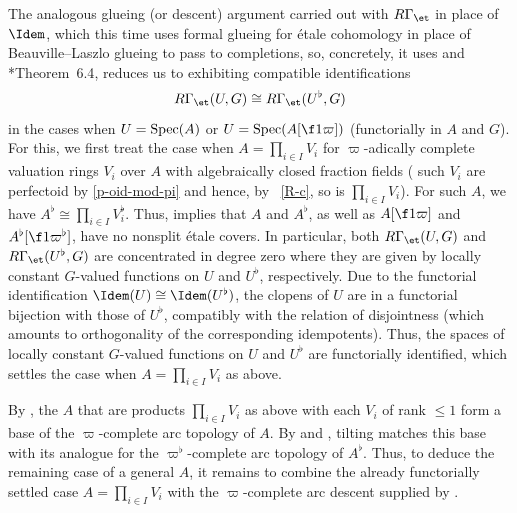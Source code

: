 The analogous glueing (or descent) argument carried out with $R\Gamma_\et$ in place of $\Idem$, %
which this time uses formal glueing for \'{e}tale cohomology in place of Beauville--Laszlo glueing to pass to completions, so, concretely, it uses  and \cite{BM20}*{Theorem~6.4},
 reduces us to exhibiting compatible identifications
\[
R\Gamma_\et(U, G) \cong R\Gamma_\et(U^\flat, G)
\]
in the cases when $U = \operatorname{Spec}(A)$ or $U = \Spec(A[\f 1\varpi])$ (functorially in $A$ and $G$). For this, we first treat the case when $A = \prod_{i \in I} V_i$ for $\varpi$-adically complete valuation rings $V_i$ over $A$ with algebraically closed fraction fields  (%
such $V_i$ are perfectoid by \eqref{p-oid-mod-pi} and hence, by ~\ref{R-c}, so is $\prod_{i \in I} V_i$). For such $A$, we have $A^\flat \cong \prod_{i \in I} V_i^\flat$. Thus,  implies that $A$ and $A^\flat$, as well as $A[\f 1\varpi]$ and $A^\flat[\f 1{\varpi^\flat}]$, have no nonsplit \'{e}tale covers. In particular, both $R\Gamma_\et(U, G)$ and $R\Gamma_\et(U^\flat, G)$ are concentrated in degree zero where they are given by locally constant $G$-valued functions on $U$ and $U^\flat$, respectively. Due to the functorial identification $\Idem(U) \cong \Idem(U^\flat)$, the clopens of $U$ are in a functorial bijection with those of $U^\flat$, compatibly with the relation of  disjointness (which amounts to orthogonality of the corresponding idempotents). Thus, the spaces of locally constant $G$-valued functions on $U$ and $U^\flat$ are functorially identified, which settles the case when $A = \prod_{i \in I} V_i$ as above.

By , the $A$ that are products $\prod_{i \in I} V_i$ as above with each $V_i$ of rank $\le 1$ form a base of the $\varpi$-complete arc topology of $A$. By  and , tilting matches this base with its analogue for the $\varpi^\flat$-complete arc topology of $A^\flat$. Thus, to deduce the remaining case of a general $A$, it remains to combine the already functorially settled case $A = \prod_{i \in I} V_i$ with the $\varpi$-complete arc descent supplied by .
\epf

















